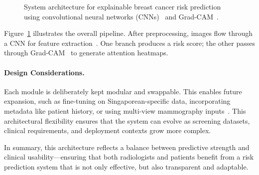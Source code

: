 \documentclass[12pt]{article}
\begin{document}
\begin{figure}[H]
    \centering
    \caption{System architecture for explainable breast cancer risk prediction using convolutional neural networks (CNNs)~\cite{1} and Grad-CAM~\cite{5}.}
    \label{fig:system_architecture}
\end{figure}

Figure~\ref{fig:system_architecture} illustrates the overall pipeline. After preprocessing, images flow through a CNN for feature extraction~\cite{1}. One branch produces a risk score; the other passes through Grad-CAM~\cite{5} to generate attention heatmaps.

\paragraph{Design Considerations.}
Each module is deliberately kept modular and swappable. This enables future expansion, such as fine-tuning on Singaporean-specific data, incorporating metadata like patient history, or using multi-view mammography inputs~\cite{8}. This architectural flexibility ensures that the system can evolve as screening datasets, clinical requirements, and deployment contexts grow more complex.

In summary, this architecture reflects a balance between predictive strength and clinical usability—ensuring that both radiologists and patients benefit from a risk prediction system that is not only effective, but also transparent and adaptable.
\end{document}
